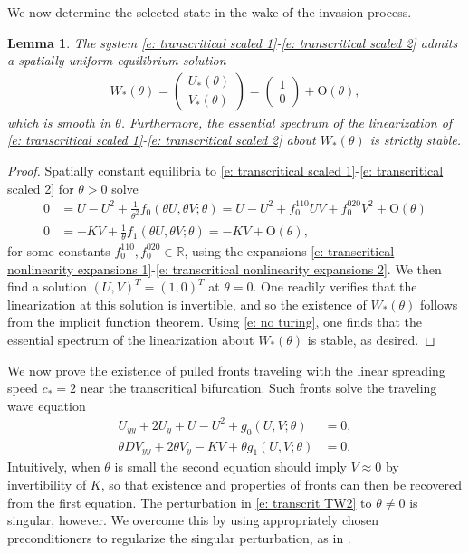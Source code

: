 \documentclass[11pt]{article}
\newcommand{\R}{\mathbb{R}}
\newtheorem{lemma}[prop]{Lemma}
\numberwithin{equation}{section}
\numberwithin{prop}{section}
\begin{document}
We now determine the selected state in the wake of the invasion process.
\begin{lemma}\label{l: transcritical stability on left}
	The system \eqref{e: transcritical scaled 1}-\eqref{e: transcritical scaled 2} admits a spatially uniform equilibrium solution 
	\begin{align}
		W_* (\theta) = \begin{pmatrix} U_*(\theta) \\ V_*(\theta) \end{pmatrix} = \begin{pmatrix} 1 \\ 0 \end{pmatrix} + \mathrm{O}(\theta),
	\end{align}
	which is smooth in $\theta$. Furthermore, the essential spectrum of the linearization of \eqref{e: transcritical scaled 1}-\eqref{e: transcritical scaled 2} about $W_*(\theta)$ is strictly stable. 
\end{lemma}
\begin{proof}
	Spatially constant equilibria to \eqref{e: transcritical scaled 1}-\eqref{e: transcritical scaled 2} for $\theta > 0$ solve
	\begin{align}
		0 &= U - U^2 + \frac{1}{\theta^2} f_0 (\theta U, \theta V; \theta) = U - U^2 + f_0^{110} U V + f_0^{020} V^2 + \mathrm{O}(\theta) \\
		0 &= -K V + \frac{1}{\theta} f_1 (\theta U, \theta V; \theta) = - KV + \mathrm{O}(\theta),
	\end{align}
	for some constants $f^{110}_0, f_0^{020} \in \R$, using the expansions \eqref{e: transcritical nonlinearity expansions 1}-\eqref{e: transcritical nonlinearity expansions 2}. We then find a solution $(U, V)^T = (1, 0)^T$ at $\theta = 0$. One readily verifies that the linearization at this solution is invertible, and so the existence of $W_*(\theta)$ follows from the implicit function theorem. Using \eqref{e: no turing}, one finds that the essential spectrum of the linearization about $W_*(\theta)$ is stable, as desired. 
\end{proof}

We now prove the existence of pulled fronts traveling with the linear spreading speed $c_* = 2$ near the transcritical bifurcation. Such fronts solve the traveling wave equation
\begin{align}
U_{yy} + 2 U_y + U - U^2 + g_0 (U, V; \theta) &= 0, \label{e: transcrit TW1}\\
\theta D V_{yy} + 2 \theta V_y -  K V + \theta g_1 (U, V; \theta) &= 0. \label{e: transcrit TW2}
\end{align}
Intuitively, when $\theta$ is small the second equation should imply $V \approx 0$ by invertibility of $K$, so that existence and properties of fronts can then be recovered from the first equation. The perturbation in \eqref{e: transcrit TW2} to $\theta \neq 0$ is singular, however. We overcome this by using appropriately chosen preconditioners to regularize the singular perturbation, as in \cite{AveryGarenaux}. 
\end{document}
